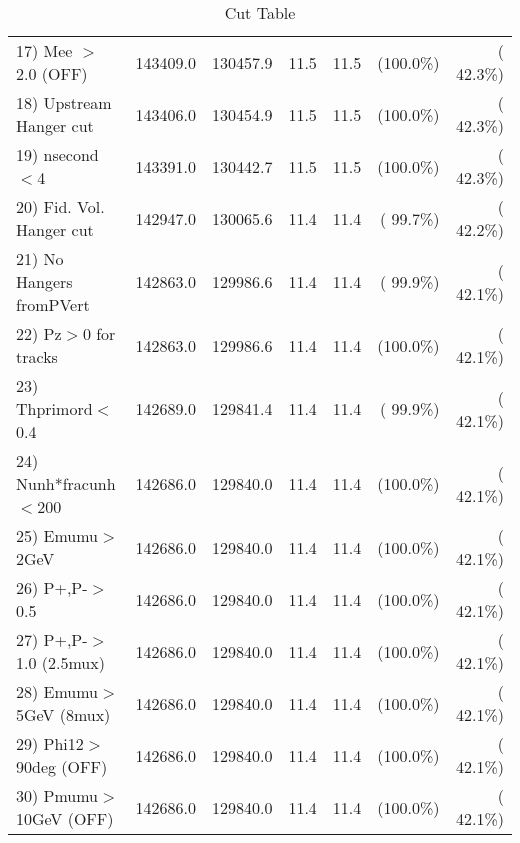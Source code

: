 \begin{table}[h!]
\begin{tabular}{||l||r|r|r|r|r|r||}
 17) Mee $>$ 2.0  (OFF)   &     143409.0 &     130457.9 &         11.5 &         11.5 & (100.0\%) & ( 42.3\%) \\
 18) Upstream Hanger cut  &     143406.0 &     130454.9 &         11.5 &         11.5 & (100.0\%) & ( 42.3\%) \\
 19) nsecond$<$4          &     143391.0 &     130442.7 &         11.5 &         11.5 & (100.0\%) & ( 42.3\%) \\
 20) Fid. Vol. Hanger cut &     142947.0 &     130065.6 &         11.4 &         11.4 & ( 99.7\%) & ( 42.2\%) \\
 21) No Hangers fromPVert &     142863.0 &     129986.6 &         11.4 &         11.4 & ( 99.9\%) & ( 42.1\%) \\
 22) Pz$>$0 for tracks    &     142863.0 &     129986.6 &         11.4 &         11.4 & (100.0\%) & ( 42.1\%) \\
 23) Thprimord$<$0.4      &     142689.0 &     129841.4 &         11.4 &         11.4 & ( 99.9\%) & ( 42.1\%) \\
 24) Nunh*fracunh$<$200   &     142686.0 &     129840.0 &         11.4 &         11.4 & (100.0\%) & ( 42.1\%) \\
 25) Emumu$>$2GeV         &     142686.0 &     129840.0 &         11.4 &         11.4 & (100.0\%) & ( 42.1\%) \\
 26) P+,P-$>$0.5          &     142686.0 &     129840.0 &         11.4 &         11.4 & (100.0\%) & ( 42.1\%) \\
 27) P+,P-$>$1.0 (2.5mux) &     142686.0 &     129840.0 &         11.4 &         11.4 & (100.0\%) & ( 42.1\%) \\
 28) Emumu$>$5GeV  (8mux) &     142686.0 &     129840.0 &         11.4 &         11.4 & (100.0\%) & ( 42.1\%) \\
 29) Phi12$>$90deg  (OFF) &     142686.0 &     129840.0 &         11.4 &         11.4 & (100.0\%) & ( 42.1\%) \\
 30) Pmumu$>$10GeV  (OFF) &     142686.0 &     129840.0 &         11.4 &         11.4 & (100.0\%) & ( 42.1\%) \\
 \hline
 \hline
 \end{tabular}
 \caption{Cut Table           }
 \label{tab-cutcohjpsi-mumu_jpsi}
 \end{table}
